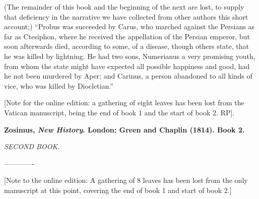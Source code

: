 (The remainder of this book and the beginning of the next are lost, to supply that deficiency in the narrative we have collected from other authors this short account;) ``Probus was succeeded by Carus, who marched against the Persians as far as Ctesiphon, where he received the appellation of the Persian emperor, but soon afterwards died, according to some, of a disease, though others state, that he was killed by lightning. He had two sons, Numerianus a very promising youth, from whom the state might have expected all possible happiness and good, had he not been murdered by Aper; and Carinus, a person abandoned to all kinds of vice, who was killed by Diocletian.''

[Note for the online edition: a gathering of eight leaves has been lost from the
Vatican manuscript, being the end of book 1 and the start of book 2. RP].


\textbf{Zosimus, \emph{New History}. London: Green and Chaplin
(1814). Book 2.}

\emph{SECOND BOOK.}

-------------

[Note to the online edition: A gathering of 8 leaves has been lost from the only
manuscript at this point, covering the end of book 1 and start of book 2.]

